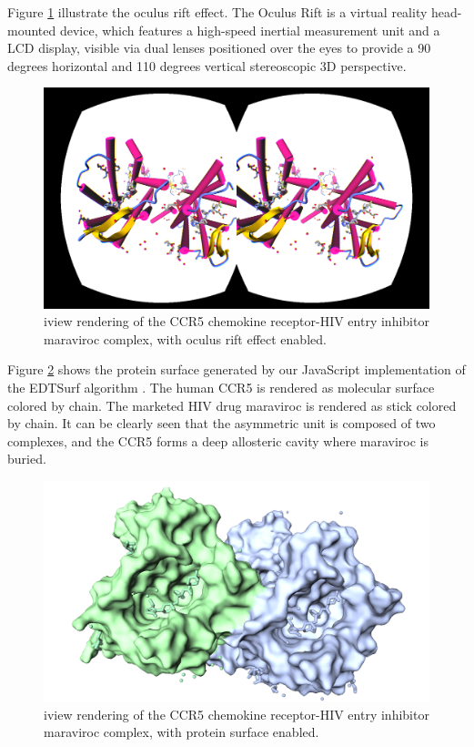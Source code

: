 Figure \ref{fig:oculusrift} illustrate the oculus rift effect. The Oculus Rift is a virtual reality head-mounted device, which features a high-speed inertial measurement unit and a LCD display, visible via dual lenses positioned over the eyes to provide a 90 degrees horizontal and 110 degrees vertical stereoscopic 3D perspective.

\begin{figure}
\begin{center}
\includegraphics{../iview/oculusrift.png}
\end{center}
\caption{iview rendering of the CCR5 chemokine receptor-HIV entry inhibitor maraviroc complex, with oculus rift effect enabled.}
\label{fig:oculusrift}
\end{figure}

Figure \ref{fig:surface} shows the protein surface generated by our JavaScript implementation of the EDTSurf algorithm \citep{1297,1350}. The human CCR5 is rendered as molecular surface colored by chain. The marketed HIV drug maraviroc is rendered as stick colored by chain. It can be clearly seen that the asymmetric unit is composed of two complexes, and the CCR5 forms a deep allosteric cavity where maraviroc is buried.

\begin{figure}
\begin{center}
\includegraphics{../iview/surface.png}
\end{center}
\caption{iview rendering of the CCR5 chemokine receptor-HIV entry inhibitor maraviroc complex, with protein surface enabled.}
\label{fig:surface}
\end{figure}

